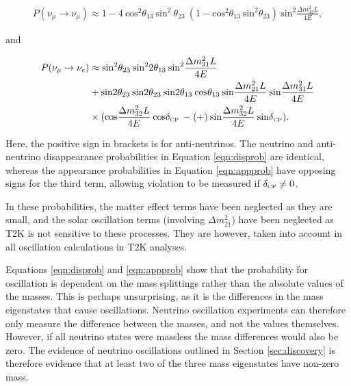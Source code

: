 \begin{equation}
\begin{aligned}
P(\nu_\mu \rightarrow \nu_\mu) \approx 1 - 4 \: \text{cos}^2\theta_{13} \: \text{sin}^2 \: \theta_{23} \: (1 - \text{cos}^2\theta_{13} \: \text{sin}^2\theta_{23}) \: \text{sin}^2\frac{\Delta m_{32}^2 L}{4E},
\end{aligned}
\label{eqn:disprob}
\end{equation}

and

\begin{equation}
\begin{aligned}
P(\nu_\mu \rightarrow \nu_e) &\approx \text{sin}^2\theta_{23} \: \text{sin}^2 2\theta_{13} \: \text{sin}^2 \frac{\Delta m_{31}^2 L}{4E}\\
&+\text{sin}2\theta_{23} \: \text{sin}2\theta_{23} \: \text{sin}2\theta_{13} \: \text{cos}\theta_{13} \: \text{sin}\frac{\Delta m_{21}^2 L}{4E} \: \text{sin}\frac{\Delta m_{31}^2 L}{4E}\\
&\times (\text{cos} \frac{\Delta m_{32}^2 L}{4E} \: \text{cos}\delta_{\scriptscriptstyle\mathrm{CP}} \: - (+) \: \text{sin} \frac{\Delta m_{32}^2 L}{4E} \: \text{sin} \delta_{\scriptscriptstyle\mathrm{CP}}).
\end{aligned}
\label{eqn:appprob}
\end{equation}

Here, the positive sign in brackets is for anti-neutrinos. The neutrino and anti-neutrino disappearance probabilities in Equation \eqref{eqn:disprob} are identical, whereas the appearance probabilities in Equation \eqref{eqn:appprob} have opposing signs for the third term, allowing \CP violation to be measured if $\delta_{\scriptscriptstyle\mathrm{CP}} \neq 0$.

In these probabilities, the matter effect terms have been neglected as they are small, and the solar oscillation terms (involving $\Delta m_{21}^2$) have been neglected as T2K is not sensitive to these processes. They are however, taken into account in all oscillation calculations in T2K analyses.

Equations \ref{eqn:disprob} and \ref{eqn:appprob} show that the probability for oscillation is dependent on the mass splittings rather than the absolute values of the masses. This is perhaps unsurprising, as it is the differences in the mass eigenstates that cause oscillations.  Neutrino oscillation experiments can therefore only measure the difference between the masses, and not the values themselves. However, if all neutrino states were massless the mass differences would also be zero. The evidence of neutrino oscillations outlined in Section \ref{sec:discovery} is therefore evidence that at least two of the three mass eigenstates have non-zero mass. 

